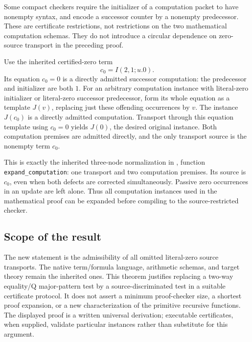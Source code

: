 Some compact checkers require the initializer of a computation packet
to have nonempty syntax, and encode a successor counter by a nonempty
predecessor. These are certificate restrictions, not restrictions
on the two mathematical computation schemas. They do not introduce
a circular dependence on zero-source transport in the preceding proof.

Use the inherited certified-zero term
\[
                         c_0=I(2,1;u.0).
\]
Its equation $c_0=0$ is a directly admitted successor computation:
the predecessor and initializer are both $1$. For an arbitrary
computation instance with literal-zero initializer or literal-zero
successor predecessor, form its whole equation as a template $J(v)$,
replacing just these offending occurrences by $v$. The instance
$J(c_0)$ is a directly admitted computation. Transport through this
equation template using $c_0=0$ yields $J(0)$, the desired original
instance. Both computation premises are admitted directly, and the
only transport source is the nonempty term $c_0$.

This is exactly the inherited three-node normalization in
, function
\texttt{expand\_computation}: one transport and two computation
premises. Its source is $c_0$, even when both defects are corrected
simultaneously. Passive zero occurrences in an update are left alone.
Thus all computation instances used in the mathematical proof can
be expanded before compiling to the source-restricted checker.

\subsection{Scope of the result}

The new statement is the admissibility of all omitted literal-zero
source transports. The native term/formula language, arithmetic
schemas, and target theory remain the inherited ones. This theorem
justifies replacing a two-way equality/Q major-pattern test by a
source-discriminated test in a suitable certificate protocol. It
does not assert a minimum proof-checker size, a shortest proof
expansion, or a new characterization of the primitive recursive
functions. The displayed proof is a written universal derivation;
executable certificates, when supplied, validate particular
instances rather than substitute for this argument.
